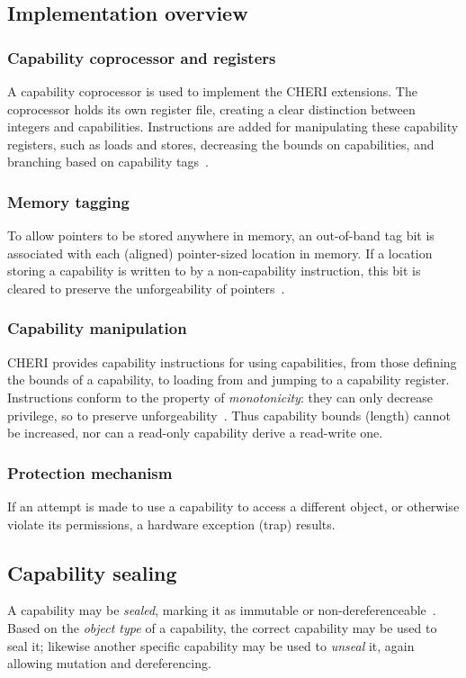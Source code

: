 \documentclass[dissertation.tex]{subfiles}
\begin{document}
\subsection{Implementation overview}

\subsubsection{Capability coprocessor and registers}
A capability coprocessor is used to implement the CHERI extensions.
The coprocessor holds its own register file, creating a clear
distinction between integers and capabilities.
Instructions are added for manipulating these capability registers, such
as loads and stores, decreasing the bounds on capabilities, and
branching based on capability tags~\cite{cheri-risc-2014}.

\subsubsection{Memory tagging}
To allow pointers to be stored anywhere in memory, an out-of-band tag
bit is associated with each (aligned) pointer-sized location in memory.
If a location storing a capability is written to by a non-capability
instruction, this bit is cleared to preserve the unforgeability of
pointers~\cite{cheri-risc-2014}.

\subsubsection{Capability manipulation}
CHERI provides capability instructions for using capabilities, from
those defining the bounds of a capability, to loading from and jumping
to a capability register.
Instructions conform to the property of \emph{monotonicity}: they can
only decrease privilege, so to preserve
unforgeability~\cite{cheri-risc-2014}.
Thus capability bounds (length) cannot be increased, nor can a read-only
capability derive a read-write one.

\subsubsection{Protection mechanism}
If an attempt is made to use a capability to access a different object,
or otherwise violate its permissions, a hardware exception (trap)
results.


\subsection{Capability sealing}
\label{sec:bg-cheri-sealing}
A capability may be \emph{sealed}, marking it as immutable or
non-dereferenceable~\cite{cheri-v6}.
Based on the \emph{object type} of a capability, the correct capability
may be used to seal it; likewise another specific capability may be used
to \emph{unseal} it, again allowing mutation and dereferencing.
\end{document}
